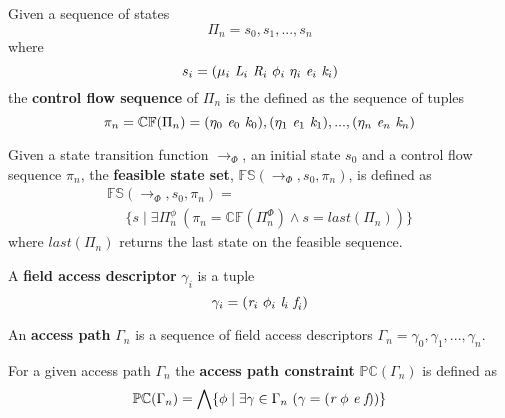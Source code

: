 \begin{definition}
Given a sequence of states $$\Pi_n = s_0,s_1,...,s_n$$ where $$s_i = ( \mu_i\ \cfgnt{L}_i\ \cfgnt{R}_i\ \phi_i\ \eta_i\ \cfgnt{e}_i\ \cfgnt{k}_i )$$ the \textbf{control flow sequence} of $\Pi_n$ is the defined as the sequence of tuples $$ \pi_n = \mathbb{CF}(\Pi_n) = (\eta_0\ \cfgnt{e}_0\ \cfgnt{k}_0),(\eta_1\ \cfgnt{e}_1\ \cfgnt{k}_1),...,(\eta_n\ \cfgnt{e}_n\ \cfgnt{k}_n)$$
\end{definition}

\begin{definition}
Given a state transition function $\rightarrow_{\Phi}$, an initial state $s_0$ and a control flow sequence $\pi_n$, the \textbf{feasible state set}, $\mathbb{FS}(\rightarrow_{\Phi},s_0,\pi_n)$, is defined as
 $$
\begin{array}{l}
\mathbb{FS}(\rightarrow_{\Phi},s_0,\pi_n) = \\
\ \ \ \ \ \ \{s \mid \exists \Pi_n^\phi\ (\pi_n = \mathbb{CF}(\Pi_n^\Phi) \wedge s = \mathit{last}(\Pi_n))\} 
\end{array}
$$
where $\mathit{last}(\Pi_n)$ returns the last state on the feasible sequence.
\end{definition}

\begin{definition}
A \textbf{field access descriptor} $\gamma_i$ is a tuple 
$$ \gamma_i = (\cfgnt{r}_i\ \phi_i\ \cfgnt{l}_i\ \cfgnt{f}_i)$$
\end{definition}

\begin{definition}
An \textbf{access path} $\Gamma_n$ is a sequence of field access descriptors
$ \Gamma_n = \gamma_0,\gamma_1,...,\gamma_n $.
\end{definition}

\begin{definition}
For a given access path $\Gamma_n$ the \textbf{access path constraint} $\mathbb{PC}(\Gamma_n)$ is defined as
$$\mathbb{PC}(\Gamma_n) =  \bigwedge \{\phi \mid \exists \gamma \in \Gamma_n \ (\gamma = (\emph{r}\ \phi\ \emph{e}\ \emph{f}))\}$$  
\end{definition}

